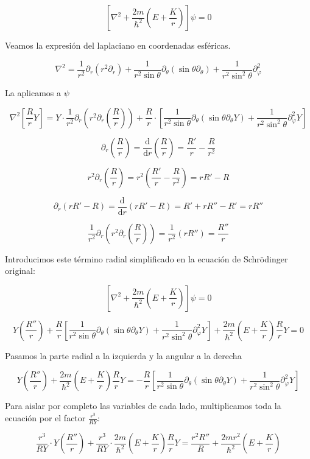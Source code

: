 \documentclass[a4paper]{article}
\begin{document}
$$\left[ \nabla^2 + \frac{2m}{\hbar^2}\left(E + \frac{K}{r}\right) \right]\psi = 0$$

Veamos la expresión del laplaciano en coordenadas esféricas.

$$\nabla^2 = \frac{1}{r^2} \partial_r (r^2 \partial_r) + \frac{1}{r^2 \sin\theta} \partial_\theta (\sin\theta \partial_\theta) + \frac{1}{r^2 \sin^2\theta} \partial_\varphi^2$$

La aplicamos a $\psi$

$$\nabla^2 \left[ \frac{R}{r}Y \right] = Y \cdot \frac{1}{r^2} \partial_r \left( r^2 \partial_r \left(\frac{R}{r}\right)\right) + \frac{R}{r} \cdot \left[ \frac{1}{r^2 \sin\theta} \partial_\theta (\sin\theta \partial_\theta Y) + \frac{1}{r^2 \sin^2\theta} \partial_\varphi^2 Y \right]$$

$$\partial_r \left(\frac{R}{r}\right) = \frac{\mathrm{d}}{\mathrm{d}r}\left(\frac{R}{r}\right) = \frac{R'}{r} - \frac{R}{r^2}$$

$$r^2 \partial_r \left(\frac{R}{r}\right) = r^2 \left( \frac{R'}{r} - \frac{R}{r^2} \right) = r R' - R$$

$$\partial_r \left( r R' - R \right) = \frac{\mathrm{d}}{\mathrm{d}r} (r R' - R) = R' + r R'' - R' = r R''$$

$$\frac{1}{r^2} \partial_r \left( r^2 \partial_r \left(\frac{R}{r}\right)\right) = \frac{1}{r^2} (r R'') = \frac{R''}{r}$$


Introducimos este término radial simplificado en la ecuación de Schrödinger original:

$$\left[ \nabla^2 + \frac{2m}{\hbar^2}\left(E + \frac{K}{r}\right) \right]\psi = 0$$

$$Y \left( \frac{R''}{r} \right) + \frac{R}{r} \left[ \frac{1}{r^2 \sin\theta} \partial_\theta (\sin\theta \partial_\theta Y) + \frac{1}{r^2 \sin^2\theta} \partial_\varphi^2 Y \right] + \frac{2m}{\hbar^2}\left(E + \frac{K}{r}\right) \frac{R}{r} Y = 0$$

Pasamos la parte radial a la izquierda y la angular a la derecha

$$Y \left( \frac{R''}{r} \right) + \frac{2m}{\hbar^2}\left(E + \frac{K}{r}\right) \frac{R}{r} Y = -\frac{R}{r} \left[ \frac{1}{r^2 \sin\theta} \partial_\theta (\sin\theta \partial_\theta Y) + \frac{1}{r^2 \sin^2\theta} \partial_\varphi^2 Y \right]$$

Para aislar por completo las variables de cada lado, multiplicamos toda la ecuación por el factor $\frac{r^3}{R Y}$:

$$\frac{r^3}{R Y} \cdot Y \left( \frac{R''}{r} \right) + \frac{r^3}{R Y} \cdot \frac{2m}{\hbar^2}\left(E + \frac{K}{r}\right) \frac{R}{r} Y = \frac{r^2 R''}{R} + \frac{2m r^2}{\hbar^2}\left(E + \frac{K}{r}\right)$$
\end{document}
